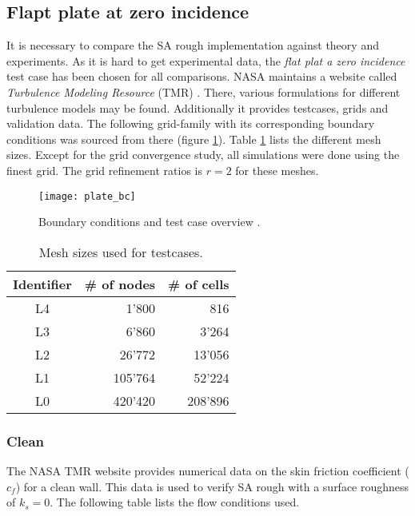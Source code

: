 \subsection{Flapt plate at zero incidence}
\label{subsec:flat_plate_exp}
It is necessary to compare the SA rough implementation against theory and
experiments. As it is hard to get experimental data, the \textit{flat plat a
zero incidence} test case has been chosen for all comparisons. NASA maintains a
website called \textit{Turbulence Modeling Resource} (TMR) \cite{rumsey_flat}. There,
various formulations for different turbulence models may be found. Additionally
it provides testcases, grids and validation data. The following grid-family with
its corresponding boundary conditions was sourced from there (figure
\ref{fig:plate_bc}). Table \ref{tab:plate_sizes} lists the different mesh sizes.
Except for the grid convergence study, all simulations were done using the
finest grid. The grid refinement ratios is $r = 2$ for these meshes.

\begin{figure}[H] \centering
\texttt{[image: plate\_bc]}
    \caption{Boundary conditions and test case overview \cite{rumsey_flat}.}
    \label{fig:plate_bc}
\end{figure}

\begin{table}[H]
  \centering
  \begin{tabular}{c r r}
    Identifier      & \# of nodes   & \# of cells \\
    \toprule
    L4              & 1'800         & 816 \\
    L3              & 6'860         & 3'264 \\
    L2              & 26'772        & 13'056 \\
    L1              & 105'764       & 52'224 \\
    L0              & 420'420       & 208'896 \\

  \end{tabular}
  \caption{Mesh sizes used for testcases.}
  \label{tab:plate_sizes}
\end{table}

\subsubsection{Clean}
The NASA TMR website \cite{rumsey_flat} provides numerical data on the skin
friction coefficient ($c_{f}$) for a clean wall. This data is used to verify SA
rough with a surface roughness of $k_{s} = 0$. The following table lists the
flow conditions used.

